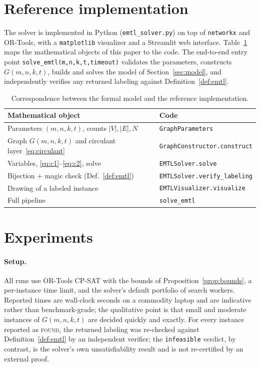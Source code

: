 \documentclass[11pt,a4paper]{article}
\theoremstyle{plain}
\theoremstyle{definition}
\theoremstyle{remark}
\newcommand{\Gfam}{G(m,n,k,t)}
\begin{document}
\section{Reference implementation}\label{sec:impl}

The solver is implemented in Python (\texttt{emtl\_solver.py}) on top of
\texttt{networkx} and OR-Tools, with a \texttt{matplotlib} visualizer and a Streamlit
web interface. Table~\ref{tab:impl} maps the mathematical objects of this paper to the
code. The end-to-end entry point \texttt{solve\_emtl(m,n,k,t,timeout)} validates the
parameters, constructs $\Gfam$, builds and solves the model of
Section~\ref{sec:model}, and independently verifies any returned labeling against
Definition~\ref{def:emtl}.

\begin{table}[t]
  \centering
  \small
  \begin{tabular}{@{}ll@{}}
    \toprule
    \textbf{Mathematical object} & \textbf{Code} \\
    \midrule
    Parameters $(m,n,k,t)$, counts $|V|,|E|,N$ & \texttt{GraphParameters} \\
    Graph $\Gfam$ and circulant layer~\eqref{eq:circulant} & \texttt{GraphConstructor.construct} \\
    Variables, \eqref{eq:c1}--\eqref{eq:c2}, solve & \texttt{EMTLSolver.solve} \\
    Bijection + magic check (Def.~\ref{def:emtl}) & \texttt{EMTLSolver.verify\_labeling} \\
    Drawing of a labeled instance & \texttt{EMTLVisualizer.visualize} \\
    Full pipeline & \texttt{solve\_emtl} \\
    \bottomrule
  \end{tabular}
  \caption{Correspondence between the formal model and the reference implementation.}
  \label{tab:impl}
\end{table}

\section{Experiments}\label{sec:experiments}

\paragraph{Setup.}
All runs use OR-Tools CP-SAT with the bounds of Proposition~\ref{prop:bounds}, a
per-instance time limit, and the solver's default portfolio of search workers.
Reported times are wall-clock seconds on a commodity laptop and are indicative
rather than benchmark-grade; the qualitative point is that small and moderate
instances of $\Gfam$ are decided quickly and exactly. For every instance reported as
\textsc{found}, the returned labeling was re-checked against
Definition~\ref{def:emtl} by an independent verifier; the \texttt{infeasible} verdict,
by contrast, is the solver's own unsatisfiability result and is not re-certified by an
external proof.
\end{document}
